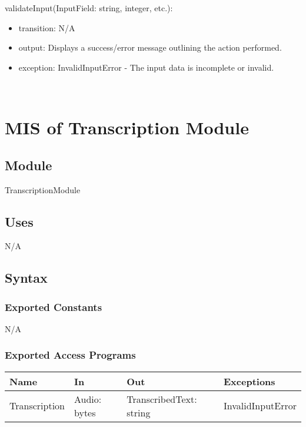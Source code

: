 \documentclass[12pt, titlepage]{article}
\begin{document}
\noindent validateInput(InputField: string, integer, etc.):
\begin{itemize}
\item transition: N/A
\item output: Displays a success/error message outlining the action performed.
\item exception: InvalidInputError - The input data is incomplete or invalid.
\end{itemize}

\newpage
~\newpage


  
\section{MIS of Transcription Module} \label{Transcription_Module}

\subsection{Module}
TranscriptionModule

\subsection{Uses}

N/A

\subsection{Syntax}

\subsubsection{Exported Constants}

N/A

\subsubsection{Exported Access Programs}

\begin{center}
\begin{tabular}{p{2cm} p{4cm} p{4cm} p{2cm}}
\hline
\textbf{Name} & \textbf{In} & \textbf{Out} & \textbf{Exceptions} \\
\hline
Transcription & Audio: bytes & TranscribedText: string & InvalidInputError & \\ 
\hline
\end{tabular}
\end{center}
\end{document}
